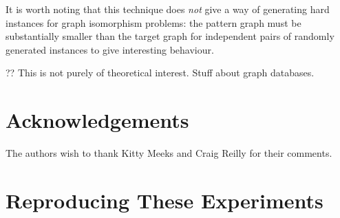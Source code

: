 \documentclass[twoside,11pt]{article}
\begin{document}
It is worth noting that this technique does \emph{not} give a way of generating hard instances for
graph isomorphism problems: the pattern graph must be substantially smaller than the target graph
for independent pairs of randomly generated instances to give interesting behaviour.

?? This is not purely of theoretical interest. Stuff about graph databases.

\section*{Acknowledgements}

The authors wish to thank Kitty Meeks and Craig Reilly for their comments.




\clearpage
\appendix

\section{Reproducing These Experiments}
\end{document}

